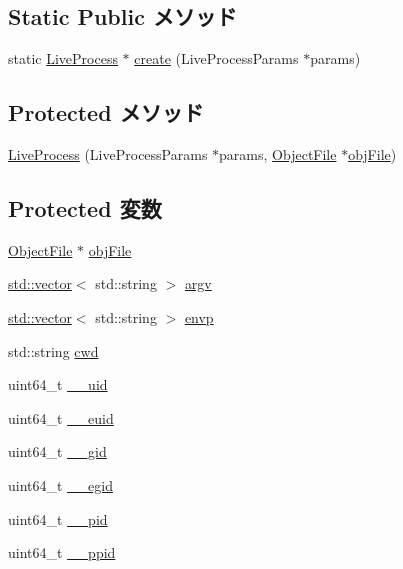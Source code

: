 \subsection*{Static Public メソッド}
\begin{DoxyCompactItemize}
\item 
static \hyperlink{classProcess_1_1LiveProcess}{LiveProcess} $\ast$ \hyperlink{classLiveProcess_aacabc29a5ca2191f72591aaf7ffaba64}{create} (LiveProcessParams $\ast$params)
\end{DoxyCompactItemize}
\subsection*{Protected メソッド}
\begin{DoxyCompactItemize}
\item 
\hyperlink{classLiveProcess_ab066d499d8c28173dc600ff40954e5ea}{LiveProcess} (LiveProcessParams $\ast$params, \hyperlink{classObjectFile}{ObjectFile} $\ast$\hyperlink{classLiveProcess_ab6cfcfa7903c66267b3e0351c3caa809}{objFile})
\end{DoxyCompactItemize}
\subsection*{Protected 変数}
\begin{DoxyCompactItemize}
\item 
\hyperlink{classObjectFile}{ObjectFile} $\ast$ \hyperlink{classLiveProcess_ab6cfcfa7903c66267b3e0351c3caa809}{objFile}
\item 
\hyperlink{classstd_1_1vector}{std::vector}$<$ std::string $>$ \hyperlink{classLiveProcess_a766c46ccd2bdbcb7f06e1188cf490b53}{argv}
\item 
\hyperlink{classstd_1_1vector}{std::vector}$<$ std::string $>$ \hyperlink{classLiveProcess_a21b2e69f52b03f0645a9203b9b1bb6d7}{envp}
\item 
std::string \hyperlink{classLiveProcess_a3b9c0a544336b86a5844f5130203fb6d}{cwd}
\item 
uint64\_\-t \hyperlink{classLiveProcess_ab5e62bf0809db4db6d1a4c37aa6817f7}{\_\-\_\-uid}
\item 
uint64\_\-t \hyperlink{classLiveProcess_a8c9c94041c682f507630112575912ef9}{\_\-\_\-euid}
\item 
uint64\_\-t \hyperlink{classLiveProcess_ac2e25e8dbd0a59fa5c2109f28532f72a}{\_\-\_\-gid}
\item 
uint64\_\-t \hyperlink{classLiveProcess_a3f4f47216d677955b6dd24c2c4dee313}{\_\-\_\-egid}
\item 
uint64\_\-t \hyperlink{classLiveProcess_a8458ebdafd0edba4f8ed5b479b652f8d}{\_\-\_\-pid}
\item 
uint64\_\-t \hyperlink{classLiveProcess_a86582782130e7b5b5ae7433c8634eec1}{\_\-\_\-ppid}
\end{DoxyCompactItemize}


